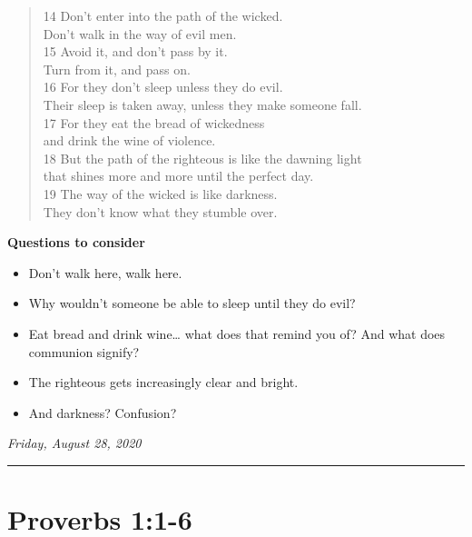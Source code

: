 \documentclass[
]{book}
\providecommand{\tightlist}{%
  \setlength{\itemsep}{0pt}\setlength{\parskip}{0pt}}
\begin{document}
\begin{quote}
14 Don't enter into the path of the wicked.\\
Don't walk in the way of evil men.\\
15 Avoid it, and don't pass by it.\\
Turn from it, and pass on.\\
16 For they don't sleep unless they do evil.\\
Their sleep is taken away, unless they make someone fall.\\
17 For they eat the bread of wickedness\\
and drink the wine of violence.\\
18 But the path of the righteous is like the dawning light\\
that shines more and more until the perfect day.\\
19 The way of the wicked is like darkness.\\
They don't know what they stumble over.
\end{quote}

\textbf{Questions to consider}

\begin{itemize}
\tightlist
\item
  Don't walk here, walk here.
\item
  Why wouldn't someone be able to sleep until they do evil?
\item
  Eat bread and drink wine\ldots{} what does that remind you of? And what does communion signify?
\item
  The righteous gets increasingly clear and bright.
\item
  And darkness? Confusion?
\end{itemize}

\emph{Friday, August 28, 2020}

\begin{center}\rule{0.5\linewidth}{0.5pt}\end{center}

\hypertarget{proverbs-11-6}{%
\section{Proverbs 1:1-6}\label{proverbs-11-6}}
\end{document}
